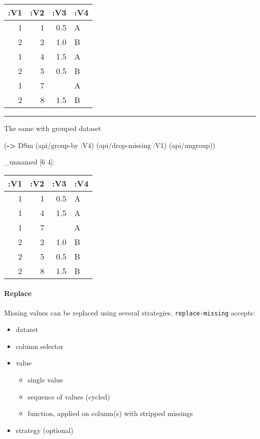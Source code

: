 \documentclass[]{article}
\newenvironment{Shaded}{\begin{snugshade}}{\end{snugshade}}
\newcommand{\KeywordTok}[1]{\textcolor[rgb]{0.13,0.29,0.53}{\textbf{#1}}}
\newcommand{\AttributeTok}[1]{\textcolor[rgb]{0.77,0.63,0.00}{#1}}
\newcommand{\NormalTok}[1]{#1}
\providecommand{\tightlist}{%
  \setlength{\itemsep}{0pt}\setlength{\parskip}{0pt}}
\let\oldparagraph\paragraph
\renewcommand{\paragraph}[1]{\oldparagraph{#1}\mbox{}}
\begin{document}
\begin{longtable}[]{@{}rrrl@{}}
\toprule
:V1 & :V2 & :V3 & :V4\tabularnewline
\midrule
\endhead
1 & 1 & 0.5 & A\tabularnewline
2 & 2 & 1.0 & B\tabularnewline
1 & 4 & 1.5 & A\tabularnewline
2 & 5 & 0.5 & B\tabularnewline
1 & 7 & & A\tabularnewline
2 & 8 & 1.5 & B\tabularnewline
\bottomrule
\end{longtable}

\begin{center}\rule{0.5\linewidth}{0.5pt}\end{center}

The same with grouped dataset

\begin{Shaded}
\begin{Highlighting}[]
\NormalTok{(}\KeywordTok{->}\NormalTok{ DSm}
\NormalTok{    (api/group-by }\AttributeTok{:V4}\NormalTok{)}
\NormalTok{    (api/drop-missing }\AttributeTok{:V1}\NormalTok{)}
\NormalTok{    (api/ungroup))}
\end{Highlighting}
\end{Shaded}

\_unnamed {[}6 4{]}:

\begin{longtable}[]{@{}rrrl@{}}
\toprule
:V1 & :V2 & :V3 & :V4\tabularnewline
\midrule
\endhead
1 & 1 & 0.5 & A\tabularnewline
1 & 4 & 1.5 & A\tabularnewline
1 & 7 & & A\tabularnewline
2 & 2 & 1.0 & B\tabularnewline
2 & 5 & 0.5 & B\tabularnewline
2 & 8 & 1.5 & B\tabularnewline
\bottomrule
\end{longtable}

\paragraph{Replace}\label{replace}

Missing values can be replaced using several strategies.
\texttt{replace-missing} accepts:

\begin{itemize}
\tightlist
\item
  dataset
\item
  column selector
\item
  value

  \begin{itemize}
  \tightlist
  \item
    single value
  \item
    sequence of values (cycled)
  \item
    function, applied on column(s) with stripped missings
  \end{itemize}
\item
  strategy (optional)
\end{itemize}
\end{document}
